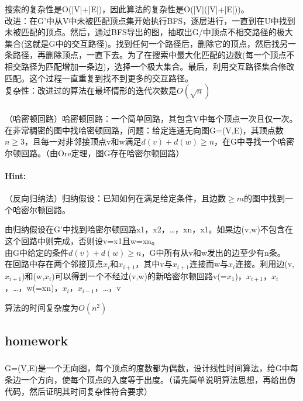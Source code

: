 \documentclass{article}
\begin{document}
搜索的复杂性是O(|V|+|E|)，因此算法的复杂性是O(|V|(|V|+|E|))。\\
改进：在G'中从V中未被匹配顶点集开始执行BFS，逐层进行，一直到在U中找到未被匹配的顶点。然后，通过BFS导出的图，抽取出G/中顶点不相交路径的极大集合(这就是G中的交互路径)。找到任何一个路径后，删除它的顶点，然后找另一条路径，再删除顶点，一直下去。为了在搜索中最大化匹配的边数(每一个顶点不相交路径为匹配增加一条边)，选择一个极大集合。最后，利用交互路径集合修改匹配。这个过程一直重复到找不到更多的交互路径。\\
复杂性：改进过的算法在最坏情形的迭代次数是$O(\sqrt{n})$

       
     \subsubsection{}（哈密顿回路）哈密顿回路：一个简单回路，其包含V中每个顶点一次且仅一次。\\
     在非常稠密的图中找哈密顿回路，问题：给定连通无向图G=(V,E)，其顶点数$n \geq 3$，且每一对非邻接顶点v和w满足$d(v)+d(w)\geq n$，在G中寻找一个哈密尔顿回路。（由Ore定理，图G存在哈密尔顿回路）

     \paragraph{Hint:}（反向归纳法）归纳假设：已知如何在满足给定条件，且边数$\geq m$的图中找到一个哈密尔顿回路。
     
     由归纳假设在G'中找到哈密尔顿回路x1，x2，…，xn，x1。如果边(v,w)不包含在这个回路中则完成，否则设v=x1且w=xn。\\
     由G中给定的条件$d(v)+d(w)\geq n$，G中所有从v和w发出的边至少有n条。\\
     在回路中存在两个邻接顶点$x_i$和$x_{i+1}$，其中v与$x_{i+1}$连接而w与$x_{i}$连接。利用边(v,$x_{i+1}$)和(w,$x_{i}$)可以得到一个不经过(v,w)的新哈密尔顿回路v(=$x_1$)，$x_{i+1}$，$x_{i}$，…，w(=xn)，$x_{i}$，$x_{i-1}$，…，v

     算法的时间复杂度为$O(n^2)$
     
     
     \subsection{homework}
     
     \subsubsection{} G=(V,E)是一个无向图，每个顶点的度数都为偶数，设计线性时间算法，给G中每条边一个方向，使每个顶点的入度等于出度。（请先简单说明算法思想，再给出伪代码，然后证明其时间复杂性符合要求）
\end{document}
